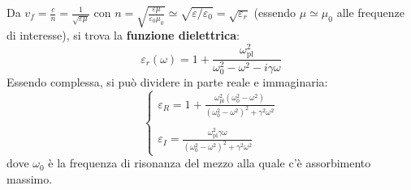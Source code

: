 \documentclass[10pt, a4paper]{scrartcl}
\numberwithin{equation}{subsection}
\theoremstyle{style1}
\begin{document}
Da $v_f = \frac{c}{n}= \frac{1}{\sqrt{\varepsilon \mu } }$ con $n = \sqrt{\frac{\varepsilon \mu }{\varepsilon _0 \mu_0}} \simeq \sqrt{\varepsilon / \varepsilon _0} = \sqrt{\varepsilon _r} $ (essendo $\mu \simeq \mu_0$ alle frequenze di interesse), si trova la \textbf{funzione dielettrica}:
\begin{equation}
	\varepsilon _r(\omega) = 1+ \frac{\omega_\text{pl}^2}{\omega_0^2 - \omega^2 - i\gamma\omega}
\end{equation}
Essendo complessa, si pu\`o dividere in parte reale e immaginaria:
\begin{equation}
	\begin{cases}
		\displaystyle \varepsilon _R = 1+ \frac{\omega_\text{pl}^2 (\omega_0^2 - \omega^2)}{(\omega_0^2 -\omega^2)^2+\gamma^2 \omega^2 }\\
		\\
		\displaystyle \varepsilon _I = \frac{\omega_\text{pl}^2 \gamma\omega}{(\omega_0^2 -\omega^2)^2+\gamma^2 \omega^2 }
	\end{cases}
\end{equation}
dove $\omega_0$ \`e la frequenza di risonanza del mezzo alla quale c'\`e assorbimento massimo.
\end{document}
